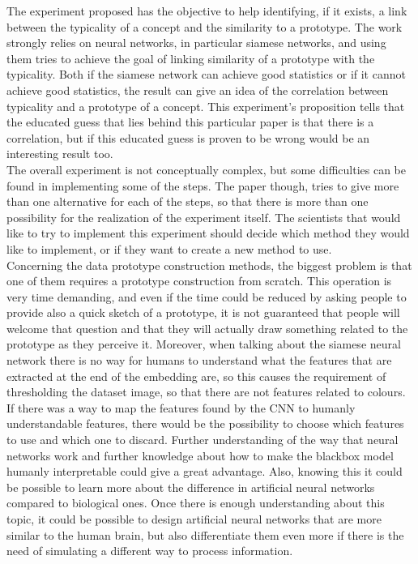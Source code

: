\documentclass[conference]{IEEEtran}
\begin{document}
		\noindent The experiment proposed has the objective to help identifying, if it exists, a link between the typicality of a concept and the similarity to a prototype. The work strongly relies on neural networks, in 
		particular siamese networks, and using them tries to achieve the goal of linking similarity of a prototype with the typicality. Both if the siamese network can achieve good statistics or if it cannot achieve 
		good statistics, the result can give an idea of the correlation between typicality and a prototype of a concept. This experiment's proposition tells that the educated guess that lies behind this particular paper 
		is that there is a correlation, but if this educated guess is proven to be wrong would be an interesting result too.\\
		The overall experiment is not conceptually complex, but some difficulties can be found in implementing some of the steps. The paper though, tries to give more than one alternative for each of the steps, so that there 
		is more than one possibility for the realization of the experiment itself. The scientists that would like to try to implement this experiment should decide which method they would like to implement, or if they 
		want to create a new method to use.\\
		Concerning the data prototype construction methods, the biggest problem is that one of them requires a prototype construction from scratch. This operation is very time demanding, and even if the time could 
		be reduced by asking people to provide also a quick sketch of a prototype, it is not guaranteed that people will welcome that question and that they will actually draw something related to the prototype as they 
		perceive it. Moreover, when talking about the siamese neural network there is no way for humans to understand what the features that are extracted at the end of the embedding are, so this causes the requirement of 
		thresholding the dataset image, so that there are not features related to colours. If there was a way to map the features found by the CNN to humanly understandable features, there would be the possibility to 
		choose which features to use and which one to discard. Further understanding of the way that neural networks work and further knowledge about how to make the blackbox model humanly interpretable could give a great 
		advantage. Also, knowing this it could be possible to learn more about the difference in artificial neural networks compared to biological ones. Once there is enough understanding about this topic, it could be possible 
		to design artificial neural networks that are more similar to the human brain, but also differentiate them even more if there is the need of simulating a different way to process information. \\ 
		
	\nocite{*}
	\printbibliography
\end{document}
